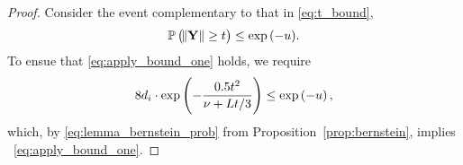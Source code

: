 \begin{proof}
    Consider the event complementary to that in \eqref{eq:t_bound},
%
\begin{align}\label{eq:apply_bound_one}
   {\mathbb{P}\left(\norm{\mathbf{Y}}\geq  t\right) \leq \exp\left(-u\right)} .
\end{align}
To ensue that \eqref{eq:apply_bound_one} holds, we 
{
require 
}
\begin{align}\label{eq:apply_bound}
        {8 d_i
        \cdot\exp{\left(-\frac{0.5t^2}{\nu+Lt/3}\right)} \leq \exp\left(-u\right),}
\end{align}
which, {by \eqref{eq:lemma_bernstein_prob} from Proposition~\ref{prop:bernstein},} implies ~\eqref{eq:apply_bound_one}.
%  

\end{proof}
